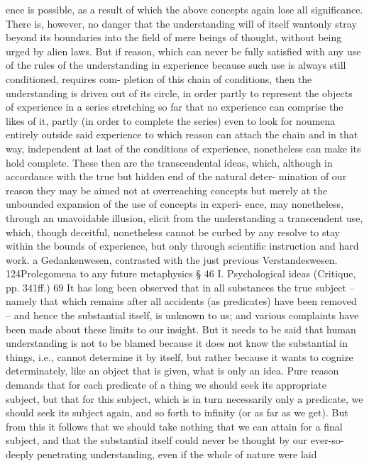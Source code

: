 ence is possible, as a result of which the above concepts again lose all
signiﬁcance.
There is, however, no danger that the understanding will of itself
wantonly stray beyond its boundaries into the ﬁeld of mere beings of
thought, without being urged by alien laws. But if reason, which can
never be fully satisﬁed with any use of the rules of the understanding in
experience because such use is always still conditioned, requires com-
pletion of this chain of conditions, then the understanding is driven out
of its circle, in order partly to represent the objects of experience in a
series stretching so far that no experience can comprise the likes of it,
partly (in order to complete the series) even to look for noumena entirely
outside said experience to which reason can attach the chain and in that
way, independent at last of the conditions of experience, nonetheless can
make its hold complete. These then are the transcendental ideas, which,
although in accordance with the true but hidden end of the natural deter-
mination of our reason they may be aimed not at overreaching concepts
but merely at the unbounded expansion of the use of concepts in experi-
ence, may nonetheless, through an unavoidable illusion, elicit from the
understanding a transcendent use, which, though deceitful, nonetheless
cannot be curbed by any resolve to stay within the bounds of experience,
but only through scientiﬁc instruction and hard work.
a
Gedankenwesen, contrasted with the just previous Verstandeswesen.
124Prolegomena to any future metaphysics
§ 46
I. Psychological ideas (Critique, pp. 341ff.) 69
It has long been observed that in all substances the true subject – namely
that which remains after all accidents (as predicates) have been removed –
and hence the substantial itself, is unknown to us; and various complaints
have been made about these limits to our insight. But it needs to be said
that human understanding is not to be blamed because it does not know
the substantial in things, i.e., cannot determine it by itself, but rather
because it wants to cognize determinately, like an object that is given,
what is only an idea. Pure reason demands that for each predicate of a
thing we should seek its appropriate subject, but that for this subject,
which is in turn necessarily only a predicate, we should seek its subject
again, and so forth to inﬁnity (or as far as we get). But from this it
follows that we should take nothing that we can attain for a ﬁnal subject,
and that the substantial itself could never be thought by our ever-so-
deeply penetrating understanding, even if the whole of nature were laid
